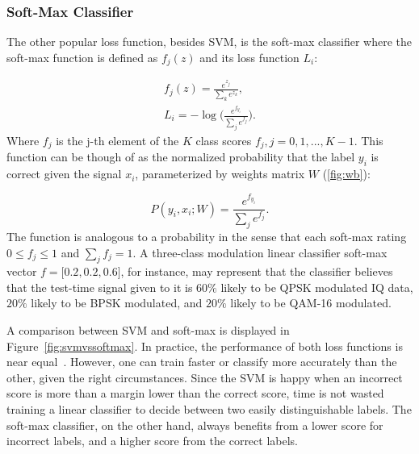 \subsubsection{Soft-Max Classifier}
The other popular loss function, besides SVM, is the soft-max classifier where the soft-max function is defined as $f_j(z)$ and its loss function $L_i$:

\begin{subequations}
\label{eq:softmax}
\begin{align}
f_j(z) = \frac{e^{z_j}}{\sum_k e^{z_k}},
\\
L_i = -\log \Bigg( \frac{e^{f_{y_i}}}{\sum_j e^{f_j}} \Bigg).
\end{align}
\end{subequations}
Where $f_j$ is the j-th element of the $K$ class scores $f_j, j=0,1,...,K-1$. This function can be though of as the normalized probability that the label $y_i$ is correct given the signal $x_i$, parameterized by weights matrix $W$ (\ref{fig:wb}):

\begin{equation}
\label{eq:probsoftmax}
P(y_i,x_i;W) = \frac{e^{f_{y_i}}}{\sum_j e^{f_j}}.
\end{equation}
The function is analogous to a probability in the sense that each soft-max rating $0 \leq f_j \leq 1$ and $\sum_j f_j = 1$. A three-class modulation linear classifier soft-max vector $f = \lbrack 0.2,0.2,0.6 \rbrack$, for instance, may represent that the classifier believes that the test-time signal given to it is $60\%$ likely to be QPSK modulated IQ data, $20\%$ likely to be BPSK modulated, and $20\%$ likely to be QAM-16 modulated.

A comparison between SVM and soft-max is displayed in Figure~\ref{fig:svmvssoftmax}. In practice, the performance of both loss functions is near equal~\cite{cs231}. However, one can train faster or classify more accurately than the other, given the right circumstances. Since the SVM is happy when an incorrect score is more than a margin lower than the correct score, time is not wasted training a linear classifier to decide between two easily distinguishable labels. The soft-max classifier, on the other hand, always benefits from a lower score for incorrect labels, and a higher score from the correct labels.

